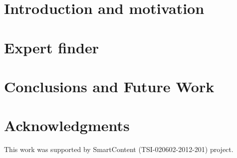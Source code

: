 \documentclass{llncs}
\begin{document}
\section{Introduction and motivation}\label{sec:Introduction}


%

\section{Expert finder}\label{sec:Motivation}


%

%


\section{Conclusions and Future Work}\label{sec:Conclusions}





\section*{Acknowledgments}

This work was supported by SmartContent (TSI-020602-2012-201) project.



%






\clearpage
{} %
\renewcommand{\indexname}{Author Index}
\printindex \clearpage
{} %
\renewcommand{\indexname}{Subject Index}
%
\end{document}
